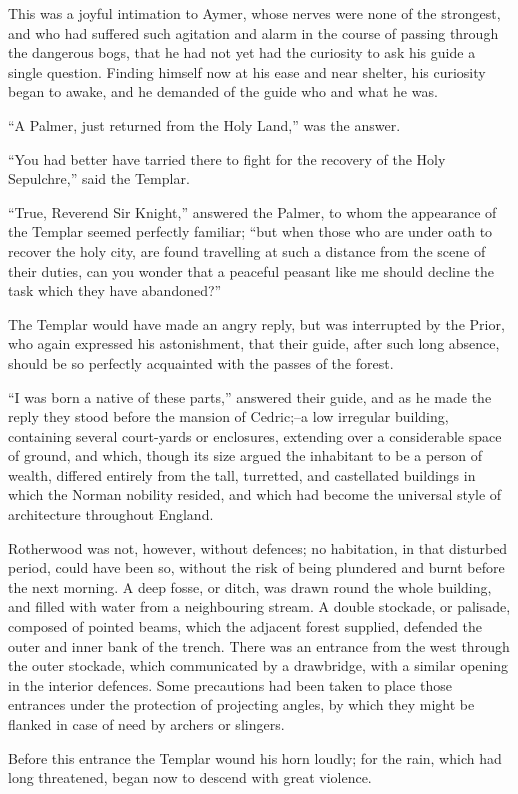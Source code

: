 This was a joyful intimation to Aymer, whose nerves were none of the
strongest, and who had suffered such agitation and alarm in the course
of passing through the dangerous bogs, that he had not yet had the
curiosity to ask his guide a single question. Finding himself now at his
ease and near shelter, his curiosity began to awake, and he demanded of
the guide who and what he was.

``A Palmer, just returned from the Holy Land,'' was the answer.

``You had better have tarried there to fight for the recovery of the
Holy Sepulchre,'' said the Templar.

``True, Reverend Sir Knight,'' answered the Palmer, to whom the
appearance of the Templar seemed perfectly familiar; ``but when those
who are under oath to recover the holy city, are found travelling at
such a distance from the scene of their duties, can you wonder that a
peaceful peasant like me should decline the task which they have
abandoned?''

The Templar would have made an angry reply, but was interrupted by the
Prior, who again expressed his astonishment, that their guide, after
such long absence, should be so perfectly acquainted with the passes of
the forest.

``I was born a native of these parts,'' answered their guide, and as he
made the reply they stood before the mansion of Cedric;--a low irregular
building, containing several court-yards or enclosures, extending over a
considerable space of ground, and which, though its size argued the
inhabitant to be a person of wealth, differed entirely from the tall,
turretted, and castellated buildings in which the Norman nobility
resided, and which had become the universal style of architecture
throughout England.

Rotherwood was not, however, without defences; no habitation, in that
disturbed period, could have been so, without the risk of being
plundered and burnt before the next morning. A deep fosse, or ditch, was
drawn round the whole building, and filled with water from a
neighbouring stream. A double stockade, or palisade, composed of pointed
beams, which the adjacent forest supplied, defended the outer and inner
bank of the trench. There was an entrance from the west through the
outer stockade, which communicated by a drawbridge, with a similar
opening in the interior defences. Some precautions had been taken to
place those entrances under the protection of projecting angles, by
which they might be flanked in case of need by archers or slingers.

Before this entrance the Templar wound his horn loudly; for the rain,
which had long threatened, began now to descend with great violence.
